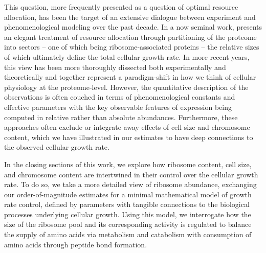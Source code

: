 
This question, more frequently presented as a question of optimal resource
allocation, has been the target of an extensive dialogue between experiment and
phenomenological modeling over the past decade. In a now seminal work,
\cite{scott2010} presents an elegant treatment of resource allocation through
partitioning of the proteome into sectors -- one of which being
ribosome-associated proteins -- the relative sizes of which ultimately define
the total cellular growth rate. In more recent years, this view has been more
thoroughly dissected both experimentally and theoretically
\citep{klumpp2014,basan2015,dai2018, dai2016, erickson2017} and together
represent a paradigm-shift in how we think of cellular physiology at the
proteome-level. However, the quantitative description of the observations is
often couched in terms of phenomenological constants and effective parameters
with the key observable features of expression being computed in relative rather
than absolute abundances. Furthermore, these approaches often exclude or
integrate away effects of cell size and chromosome content, which we have
illustrated in our estimates to have deep connections to the observed cellular
growth rate.

In the closing sections of this work, we explore how ribosome content, cell
size, and chromosome content are intertwined in their control over the cellular
growth rate. To do so, we take a more detailed view of ribosome abundance,
exchanging our order-of-magnitude estimates for a minimal mathematical model of
growth rate control, defined by parameters with tangible connections to the
biological processes underlying cellular growth. Using this model, we
interrogate how the size of the ribosome pool and its corresponding activity is
regulated to balance the supply of amino acids via metabolism and catabolism
with consumption of amino acids through peptide bond formation.

